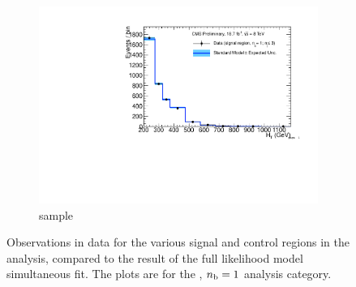 \begin{figure}[h!]
\begin{subfigure}[b]{0.48\textwidth}
    \includegraphics[width=\textwidth,page=6]
    {Figs/results/v0/blueBand/bestFit_2012dev_RQcdZero_fZinvAll_1b_le3j-12hp_smOnly}
    \caption{\gj sample}
  \end{subfigure}
  \caption{Observations in data for the various signal and control
  regions in the analysis, compared to the result of the full likelihood model
  simultaneous fit. The plots are for the \njlow, $n_{\text{b}} = 1$ analysis category.}
  \label{fig:blue_fits_1b_le3j}
\end{figure}

